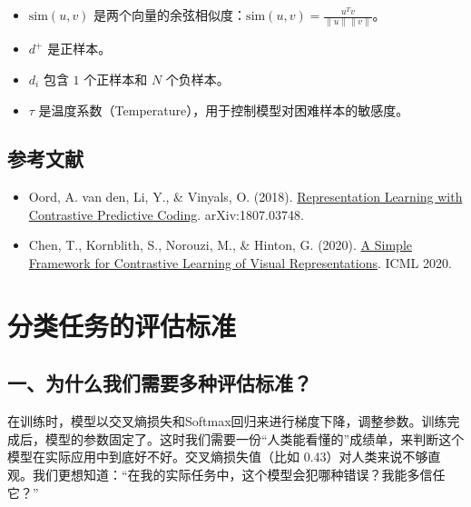 \begin{itemize}
\tightlist
\item
  \(\mathrm{sim}(u,v)\) 是两个向量的余弦相似度：\(\mathrm{sim}(u,v)=\frac{u^Tv}{\lVert u\rVert\lVert v\rVert}\)。
\item
  \(d^+\) 是正样本。
\item
  \(d_i\) 包含 \(1\) 个正样本和 \(N\) 个负样本。
\item
  \(\tau\) 是温度系数（Temperature），用于控制模型对困难样本的敏感度。
\end{itemize}

\hypertarget{ux53c2ux8003ux6587ux732e-32}{%
\subsection{参考文献}\label{ux53c2ux8003ux6587ux732e-32}}

\vspace{0.25em}
\begin{itemize}
\tightlist
\item
  Oord, A. van den, Li, Y., \& Vinyals, O. (2018). \href{https://arxiv.org/abs/1807.03748}{Representation Learning with Contrastive Predictive Coding}. arXiv:1807.03748.
\item
  Chen, T., Kornblith, S., Norouzi, M., \& Hinton, G. (2020). \href{https://proceedings.mlr.press/v119/chen20j.html}{A Simple Framework for Contrastive Learning of Visual Representations}. ICML 2020.
\end{itemize}

\clearpage

\hypertarget{ux5206ux7c7bux4efbux52a1ux7684ux8bc4ux4f30ux6807ux51c6}{%
\section{分类任务的评估标准}\label{ux5206ux7c7bux4efbux52a1ux7684ux8bc4ux4f30ux6807ux51c6}}

\hypertarget{ux4e00ux4e3aux4ec0ux4e48ux6211ux4eecux9700ux8981ux591aux79cdux8bc4ux4f30ux6807ux51c6}{%
\subsection{一、为什么我们需要多种评估标准？}\label{ux4e00ux4e3aux4ec0ux4e48ux6211ux4eecux9700ux8981ux591aux79cdux8bc4ux4f30ux6807ux51c6}}

在训练时，模型以交叉熵损失和Softmax回归来进行梯度下降，调整参数。训练完成后，模型的参数固定了。这时我们需要一份``人类能看懂的''成绩单，来判断这个模型在实际应用中到底好不好。交叉熵损失值（比如 0.43）对人类来说不够直观。我们更想知道：``在我的实际任务中，这个模型会犯哪种错误？我能多信任它？''


